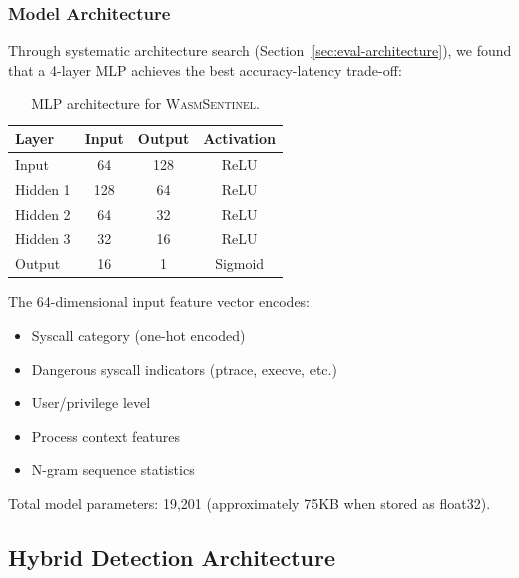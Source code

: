 \subsubsection{Model Architecture}

Through systematic architecture search (Section~\ref{sec:eval-architecture}), we found that a 4-layer MLP achieves the best accuracy-latency trade-off:

\begin{table}[t]
\centering
\caption{MLP architecture for \textsc{WasmSentinel}.}
\label{tab:mlp-arch}
\begin{tabular}{lccc}
\toprule
\textbf{Layer} & \textbf{Input} & \textbf{Output} & \textbf{Activation} \\
\midrule
Input & 64 & 128 & ReLU \\
Hidden 1 & 128 & 64 & ReLU \\
Hidden 2 & 64 & 32 & ReLU \\
Hidden 3 & 32 & 16 & ReLU \\
Output & 16 & 1 & Sigmoid \\
\bottomrule
\end{tabular}
\end{table}

The 64-dimensional input feature vector encodes:
\begin{itemize}
    \item Syscall category (one-hot encoded)
    \item Dangerous syscall indicators (ptrace, execve, etc.)
    \item User/privilege level
    \item Process context features
    \item N-gram sequence statistics
\end{itemize}

Total model parameters: 19,201 (approximately 75KB when stored as float32).

\subsection{Hybrid Detection Architecture}
\label{sec:design-hybrid}

